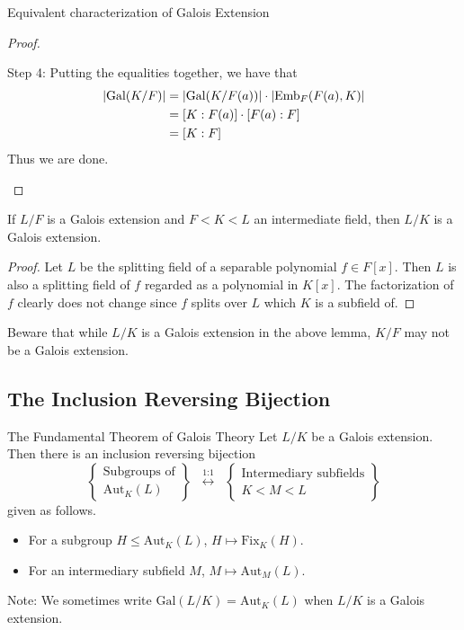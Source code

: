 \documentclass[a4paper]{article}
\begin{document}
\begin{prp}{Equivalent characterization of Galois Extension}{}
\begin{proof}
\begin{itemize}
Step 4: Putting the equalities together, we have that 
\begin{align*}
\abs{\text{Gal}(K/F)}&=\abs{\text{Gal}(K/F(a))}\cdot\abs{\text{Emb}_F(F(a),K)}\\
&=[K:F(a)]\cdot[F(a):F]\\
&=[K:F]
\end{align*}
Thus we are done. 
\end{itemize}
\end{proof}
\end{prp}

\begin{lmm}{}{} If $L/F$ is a Galois extension and $F<K<L$ an intermediate field, then $L/K$ is a Galois extension. \tcbline
\begin{proof}
Let $L$ be the splitting field of a separable polynomial $f\in F[x]$. Then $L$ is also a splitting field of $f$ regarded as a polynomial in $K[x]$. The factorization of $f$ clearly does not change since $f$ splits over $L$ which $K$ is a subfield of. 
\end{proof}
\end{lmm}

Beware that while $L/K$ is a Galois extension in the above lemma, $K/F$ may not be a Galois extension. 

\subsection{The Inclusion Reversing Bijection}
\begin{thm}{The Fundamental Theorem of Galois Theory}{} Let $L/K$ be a Galois extension. Then there is an inclusion reversing bijection $$\left\{\substack{\text{Subgroups of}\\\text{Aut}_K(L)}\right\}\;\;\overset{\text{1:1}}{\longleftrightarrow}\;\;\left\{\substack{\text{Intermediary subfields}\\ K<M<L}\right\}$$ given as follows. 
\begin{itemize}
\item For a subgroup $H\leq\text{Aut}_K(L)$, $H\mapsto\text{Fix}_K(H)$. 
\item For an intermediary subfield $M$, $M\mapsto\text{Aut}_M(L)$. 
\end{itemize}
\end{thm}

Note: We sometimes write $\text{Gal}(L/K)=\text{Aut}_K(L)$ when $L/K$ is a Galois extension. 
\end{document}
